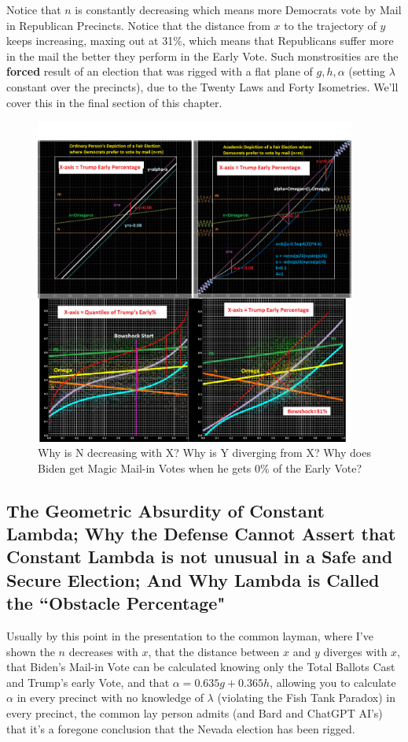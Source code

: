 \documentclass[preprint,13pt]{elsarticle}
\begin{document}
Notice that $n$ is constantly decreasing which means more Democrats vote by Mail in Republican Precincts. Notice that the distance from $x$ to the trajectory of $y$ keeps increasing, maxing out at 31\%, which means that Republicans suffer more in the mail the better they perform in the Early Vote. Such monstrosities are the \textbf{forced} result of an election that was rigged with a flat plane of $g,h,\alpha$ (setting $\lambda$ constant over the precincts), due to the Twenty Laws and Forty Isometries. We'll cover this in the final section of this chapter.
\begin{figure}[bp!]
\begin{center}
\caption{Why is N decreasing with X? Why is Y diverging from X? Why does Biden get Magic Mail-in Votes when he gets 0\% of the Early Vote?}
\includegraphics[width=300pt]{Clark County vs Common Sense.png}
\end{center}
\end{figure}
\newpage
\subsection{The Geometric Absurdity of Constant Lambda; Why the Defense Cannot Assert that Constant Lambda is not unusual in a Safe and Secure Election; And Why Lambda is Called the ``Obstacle Percentage"}

Usually by this point in the presentation to the common layman, where I've shown the $n$ decreases with $x$, that the distance between $x$ and $y$ diverges with $x$, that Biden's Mail-in Vote can be calculated knowing only the Total Ballots Cast and Trump's early Vote, and that $\alpha=0.635g+0.365h$, allowing you to calculate $\alpha$ in every precinct with no knowledge of $\lambda$ (violating the Fish Tank Paradox) in every precinct, the common lay person admits (and Bard and ChatGPT AI's) that it's a foregone conclusion that the Nevada election has been rigged.
\end{document}
